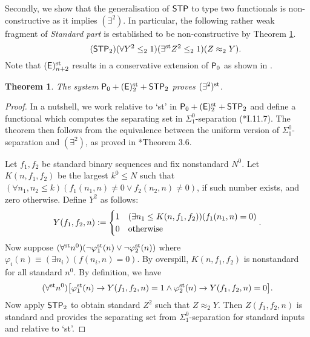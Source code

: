 \documentclass[reqno]{amsart}
\newtheorem{thm}{Theorem}
\newcommand\be{\begin{equation}}
\newcommand\ee{\end{equation}}
\def\STP{\textup{\textsf{STP}}}
\def\P{\textup{\textsf{P}}}
\def\st{\textup{st}}
\def\di{\rightarrow}
\numberwithin{equation}{section}
\numberwithin{thm}{section}
\begin{document}
Secondly, we show that the generalisation of $\STP$ to type two functionals is non-constructive as it implies $(\exists^{2})$.   
In particular, the following rather weak fragment of \emph{Standard part} is established to be non-constructive by Theorem \ref{konky}. 
%
\be\tag{$\STP_{2}$}
(\forall Y^{2}\leq_{2}1)(\exists^{\st}Z^{2}\leq_{2}1)(Z\approx_{2} Y).
\ee  
Note that $(\textsf{\textup{E}})^{\st}_{n+2}$ results in a conservative extension of $\P_{0}$ as shown in \cite{bennosam}. 
\begin{thm}\label{konky}
The system $\P_{0}+(\textsf{\textup{E}})^{\st}_{2}+\STP_{2}$ proves $(\exists^{2})^{\st}$.  
\end{thm}
\begin{proof}
In a nutshell, we work relative to `st' in $\P_{0}+(\textsf{\textup{E}})^{\st}_{2}+\STP_{2}$ and define a functional which computes the separating set in $\Sigma_{1}^{0}$-separation (\cite{simpson2}*{I.11.7}).
The theorem then follows from the equivalence between the uniform version of $\Sigma_{1}^{0}$-separation and $(\exists^{2})$, as proved in \cite{yamayamaharehare}*{Theorem 3.6}.  

\medskip

Let $f_{1}, f_{2}$ be standard binary sequences and fix nonstandard $N^{0}$.  Let $K(n, f_{1}, f_{2})$ be the largest $ k^{0}\leq N$ such that $(\forall n_{1}, n_{2}\leq k)(f_{1}(n_{1}, n)\ne 0 \vee f_{2}(n_{2}, n)\ne 0)$, if such number exists, and zero otherwise.  Define $Y^{2}$ as follows:
\[
Y(f_{1}, f_{2}, n):=
\begin{cases}
1 &  (\exists n_{1}\leq K(n, f_{1}, f_{2}))(f_{1}(n_{1}, n) = 0 )  \\
0 & \textup{otherwise}
\end{cases}.
\]
Now suppose $(\forall^{\st}n^{0})(\neg\varphi^{\st}_{1}(n)\vee \neg\varphi^{\st}_{2}(n))$ where $\varphi_{i}(n)\equiv (\exists n_{i})(f(n_{i}, n)=0)$.  
By overspill, $K(n, f_{1}, f_{2})$ is nonstandard for all standard $n^{0}$.  
By definition, we have
\[
(\forall^{\st}n^{0})\big[ \varphi^{\st}_{1}(n)\di Y(f_{1}, f_{2}, n)= 1\wedge  \varphi^{\st}_{2}(n)\di Y(f_{1}, f_{2}, n)= 0  \big].
\]
Now apply $\STP_{2}$ to obtain standard $Z^{2}$ such that $Z\approx_{2} Y $.   Then $Z(f_{1}, f_{2}, n)$ is standard and provides the separating set from $\Sigma_{1}^{0}$-separation for standard inputs and relative to `st'.     
\end{proof}
\end{document}
